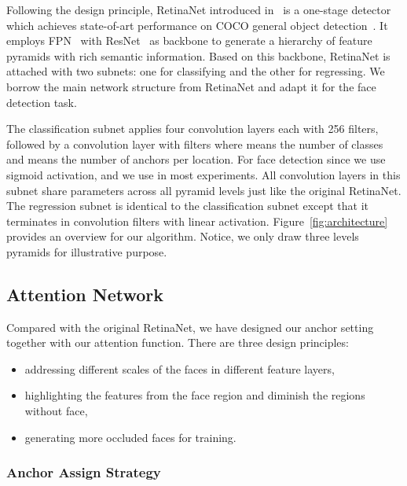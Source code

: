 \documentclass[10pt,twocolumn,letterpaper]{article}
\begin{document}
Following the design principle, RetinaNet introduced in~\cite{lin2017focal} is a one-stage detector which achieves state-of-art performance on COCO general object detection~\cite{lin2014microsoft}. It employs FPN~\cite{lin2016feature} with ResNet~\cite{He2015} as backbone to generate a hierarchy of feature pyramids with rich semantic information. Based on this backbone, RetinaNet is attached with two subnets: one for classifying and the other for regressing. We borrow the main network structure from RetinaNet and adapt it for the face detection task.
 
The classification subnet applies four  convolution layers each with 256 filters, followed by a  convolution layer with  filters where  means the number of classes and  means the number of anchors per location. For face detection  since we use sigmoid activation, and we use  in most experiments. All convolution layers in this subnet share parameters across all pyramid levels just like the original RetinaNet. The regression subnet is identical to the classification subnet except that it terminates in  convolution filters with linear activation. Figure~\ref{fig:architecture} provides an overview for our algorithm. Notice, we only draw three levels pyramids for illustrative purpose.


\subsection{Attention Network}\label{sec:attention network}

Compared with the original RetinaNet, we have designed our anchor setting together with our attention function. There are three design principles:
\begin{itemize}
\item addressing different scales of the faces in different feature layers, 
\item highlighting the features from the face region and diminish the regions without face,
\item generating more occluded faces for training. 
\end{itemize}


\subsubsection{Anchor Assign Strategy\label{sec:anchor matching}}
\end{document}
